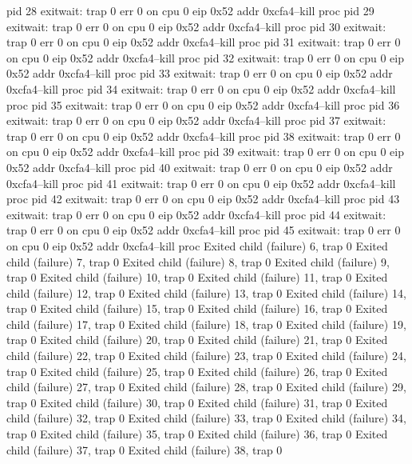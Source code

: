 \begin{listing}[style=consola]
    pid 28 exitwait: trap 0 err 0 on cpu 0 eip 0x52 addr 0xcfa4--kill proc
    pid 29 exitwait: trap 0 err 0 on cpu 0 eip 0x52 addr 0xcfa4--kill proc
    pid 30 exitwait: trap 0 err 0 on cpu 0 eip 0x52 addr 0xcfa4--kill proc
    pid 31 exitwait: trap 0 err 0 on cpu 0 eip 0x52 addr 0xcfa4--kill proc
    pid 32 exitwait: trap 0 err 0 on cpu 0 eip 0x52 addr 0xcfa4--kill proc
    pid 33 exitwait: trap 0 err 0 on cpu 0 eip 0x52 addr 0xcfa4--kill proc
    pid 34 exitwait: trap 0 err 0 on cpu 0 eip 0x52 addr 0xcfa4--kill proc
    pid 35 exitwait: trap 0 err 0 on cpu 0 eip 0x52 addr 0xcfa4--kill proc
    pid 36 exitwait: trap 0 err 0 on cpu 0 eip 0x52 addr 0xcfa4--kill proc
    pid 37 exitwait: trap 0 err 0 on cpu 0 eip 0x52 addr 0xcfa4--kill proc
    pid 38 exitwait: trap 0 err 0 on cpu 0 eip 0x52 addr 0xcfa4--kill proc
    pid 39 exitwait: trap 0 err 0 on cpu 0 eip 0x52 addr 0xcfa4--kill proc
    pid 40 exitwait: trap 0 err 0 on cpu 0 eip 0x52 addr 0xcfa4--kill proc
    pid 41 exitwait: trap 0 err 0 on cpu 0 eip 0x52 addr 0xcfa4--kill proc
    pid 42 exitwait: trap 0 err 0 on cpu 0 eip 0x52 addr 0xcfa4--kill proc
    pid 43 exitwait: trap 0 err 0 on cpu 0 eip 0x52 addr 0xcfa4--kill proc
    pid 44 exitwait: trap 0 err 0 on cpu 0 eip 0x52 addr 0xcfa4--kill proc
    pid 45 exitwait: trap 0 err 0 on cpu 0 eip 0x52 addr 0xcfa4--kill proc
    Exited child (failure) 6, trap 0
    Exited child (failure) 7, trap 0
    Exited child (failure) 8, trap 0
    Exited child (failure) 9, trap 0
    Exited child (failure) 10, trap 0
    Exited child (failure) 11, trap 0
    Exited child (failure) 12, trap 0
    Exited child (failure) 13, trap 0
    Exited child (failure) 14, trap 0
    Exited child (failure) 15, trap 0
    Exited child (failure) 16, trap 0
    Exited child (failure) 17, trap 0
    Exited child (failure) 18, trap 0
    Exited child (failure) 19, trap 0
    Exited child (failure) 20, trap 0
    Exited child (failure) 21, trap 0
    Exited child (failure) 22, trap 0
    Exited child (failure) 23, trap 0
    Exited child (failure) 24, trap 0
    Exited child (failure) 25, trap 0
    Exited child (failure) 26, trap 0
    Exited child (failure) 27, trap 0
    Exited child (failure) 28, trap 0
    Exited child (failure) 29, trap 0
    Exited child (failure) 30, trap 0
    Exited child (failure) 31, trap 0
    Exited child (failure) 32, trap 0
    Exited child (failure) 33, trap 0
    Exited child (failure) 34, trap 0
    Exited child (failure) 35, trap 0
    Exited child (failure) 36, trap 0
    Exited child (failure) 37, trap 0
    Exited child (failure) 38, trap 0

\end{listing}
